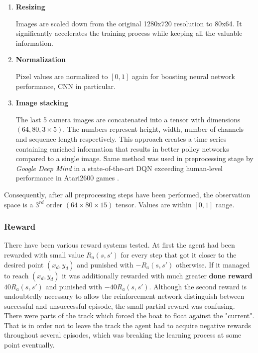 \begin{enumerate}
\newpage

    \item \textbf{Resizing}
    
    Images are scaled down from the original 1280x720 resolution to 80x64. It significantly accelerates the training process while keeping all the valuable information.
    
    \item \textbf{Normalization}

    Pixel values are normalized to $[0, 1]$ again for boosting neural network performance, CNN in particular.
    
    \item \textbf{Image stacking}
    
    The last 5 camera images are concatenated into a tensor with dimensions $(64, 80, 3 \times 5)$. The numbers represent height, width, number of channels and sequence length respectively. This approach creates a time series containing enriched information that results in better policy networks compared to a single image. Same method was used in preprocessing stage by \emph{Google Deep Mind} in a state-of-the-art DQN exceeding human-level performance in Atari2600 games \cite{DQNAtari}.
\end{enumerate}

Consequently, after all preprocessing steps have been performed, the observation space is a $3^{rd}$ order $(64 \times 80 \times 15)$ tensor. Values are within $[0, 1]$ range.

\subsubsection*{Reward}
\label{sub2:reward}

There have been various reward systems tested. At first the agent had been rewarded with small value $R_a(s, s')$ for every step that got it closer to the desired point $(x_d, y_d)$ and punished with $-R_a(s, s')$ otherwise. If it managed to reach $(x_d, y_d)$ it was additionally rewarded with much greater \textbf{done reward} $40R_a(s, s')$ and punished with $-40R_a(s, s')$. Although the second reward is undoubtedly necessary to allow the reinforcement network distinguish between successful and unsuccessful episode, the small partial reward was confusing. There were parts of the track which forced the boat to float against the "current". That is in order not to leave the track the agent had to acquire negative rewards throughout several episodes, which was breaking the learning process at some point eventually.

